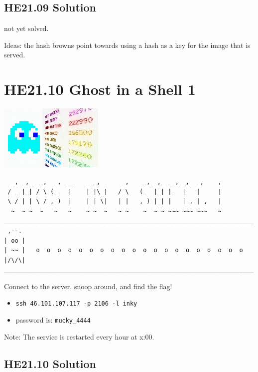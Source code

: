 \documentclass[english,a4paper,nols,noindent]{tufte-handout}
\begin{document}
\hypertarget{he21.09-solution}{%
\subsection{HE21.09 Solution}\label{he21.09-solution}}

not yet solved.

Ideas: the hash browns point towards using a hash as a key for the image that is served.

\hypertarget{he21.10}{%
\section{HE21.10 Ghost in a Shell 1}\label{he21.10}}
\begin{marginfigure}
    \includegraphics[width=50mm]{images/challenge10.jpg}
\end{marginfigure}

\begin{verbatim}
  _, _,_  _,  _, ___   _ _, _    _,    _, _,_ __, _,  _,    ,  
 / _ |_| / \ (_   |    | |\ |   /_\   (_  |_| |_  |   |     |  
 \ / | | \ / , )  |    | | \|   | |   , ) | | |   | , | ,   |  
  ~  ~ ~  ~   ~   ~    ~ ~  ~   ~ ~    ~  ~ ~ ~~~ ~~~ ~~~   ~  
______________________________________________________________________  
 ,--.    
| oo |   
| ~~ |   o  o  o  o  o  o  o  o  o  o  o  o  o  o  o  o  o  o  o  o  
|/\/\|   
______________________________________________________________________  
\end{verbatim}
Connect to the server, snoop around, and find the flag!

\begin{itemize}
\item \verb+ssh 46.101.107.117 -p 2106 -l inky+
\item password is: \verb+mucky_4444+
\end{itemize}
Note: The service is restarted every hour at x:00.

\hypertarget{he21.10-solution}{%
\subsection{HE21.10 Solution}\label{he21.10-solution}}
\end{document}
